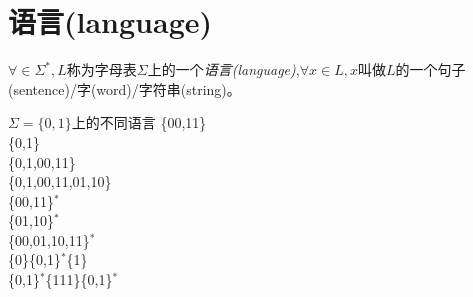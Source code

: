 \section{语言(language)}
$\forall \in\Sigma^{\ast},L$称为字母表$\Sigma$上的一个\emph{语言(language)},$\forall x\in L,x$叫做$L$的一个句子(sentence)/字(word)/字符串(string)。
\begin{example}
	$\Sigma = \{0,1\}$上的不同语言
	\{00,11\}\\
	\{0,1\}\\
	\{0,1,00,11\}\\
	\{0,1,00,11,01,10\}\\
	\{00,11\}$^{\ast}$\\
	\{01,10\}$^{\ast}$\\
	\{00,01,10,11\}$^{\ast}$\\
	\{0\}\{0,1\}$^{\ast}$\{1\}\\
	\{0,1\}$^{\ast}$\{111\}\{0,1\}$^{\ast}$\\
\end{example}


